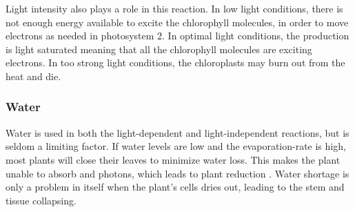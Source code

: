 Light intensity also plays a role in this reaction. In low light conditions, there is not enough energy available to excite the chlorophyll molecules, in order to move electrons as needed in photosystem 2. In optimal light conditions, the production is light saturated meaning that all the chlorophyll molecules are exciting electrons. In too strong light conditions, the chloroplasts may burn out from the heat and die.  

\subsubsection{Water}
Water is used in both the light-dependent and light-independent reactions, but is seldom a limiting factor. If water levels are low and the evaporation-rate is high, most plants will close their leaves to minimize water loss. This makes the plant unable to absorb  and photons, which leads to plant reduction \citep{bi2}. Water shortage is only a problem in itself when the plant's cells dries out, leading to the stem and tissue collapsing. 




